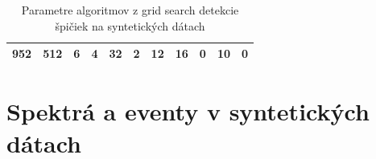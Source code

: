 \begin{table}[h]
\begin{tabular}{|c|c|ccc|cc|cccc|}
952                                                                               & 512                                                                     & \multicolumn{1}{c|}{6}           & \multicolumn{1}{c|}{4}                  & 32                & \multicolumn{1}{c|}{2}                                 & 12                                & \multicolumn{1}{c|}{16}  & \multicolumn{1}{c|}{0}   & \multicolumn{1}{c|}{10}  & 0   \\ \hline
\end{tabular}
\caption{Parametre algoritmov z grid search detekcie špičiek na syntetických dátach}
\end{table}



\section{Spektrá a eventy v syntetických dátach}


